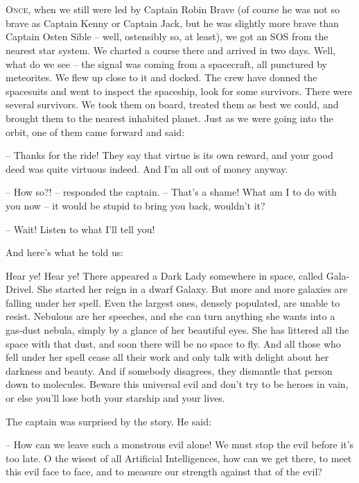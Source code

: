 \documentclass[ebook,oneside,final,openright]{memoir}
\begin{document}
\chapter{}
\par
\lettrine{O}{nce,} when we still were led by Captain Robin Brave (of course he was not so brave as Captain Kenny or Captain Jack, but he was slightly more brave than Captain Osten Sible – well, ostensibly so, at least), we got an SOS from the nearest star system. We charted a course there and arrived in two days. Well, what do we see – the signal was coming from a spacecraft, all punctured by meteorites. We flew up close to it and docked. The crew have donned the spacesuits and went to inspect the spaceship, look for some survivors. There were several survivors. We took them on board, treated them as best we could, and brought them to the nearest inhabited planet. Just as we were going into the orbit, one of them came forward and said: \par
\par
– Thanks for the ride! They say that virtue is its own reward, and your good deed was quite virtuous indeed. And I’m all out of money anyway.\par
– How so?! – responded the captain. – That’s a shame! What am I to do with you now – it would be stupid to bring you back, wouldn’t it? \par
– Wait! Listen to what I’ll tell you! \par
 And here’s what he told us:\par
\par
Hear ye! Hear ye! There appeared a Dark Lady somewhere in space, called Gala-Drivel. She started her reign in a dwarf Galaxy. But more and more galaxies are falling under her spell. Even the largest ones, densely populated, are unable to resist. Nebulous are her speeches, and she can turn anything she wants into a gas-dust nebula, simply by a glance of her beautiful eyes. She has littered all the space with that dust, and soon there will be no space to fly. And all those who fell under her spell cease all their work and only talk with delight about her darkness and beauty. And if somebody disagrees, they dismantle that person down to molecules. Beware this universal evil and don’t try to be heroes in vain, or else you’ll lose both your starship and your lives.\par
\par
The captain was surprised by the story. He said:\par
– How can we leave such a monstrous evil alone! We must stop the evil before it’s too late. O the wisest of all Artificial Intelligences, how can we get there, to meet this evil face to face, and to measure our strength against that of the evil?\par
\end{document}
